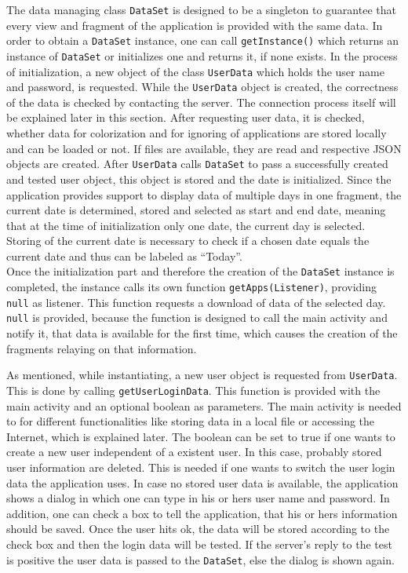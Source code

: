 The  data managing class \lstinline{DataSet} is designed to be a singleton to guarantee that every view and fragment of the application is provided with the same data. In order to obtain a \lstinline$DataSet$ instance, one can call \lstinline$getInstance()$ which returns an instance of \lstinline$DataSet$ or initializes one and returns it, if none exists. In the process of initialization, a new object of the class \lstinline$UserData$ which holds the user name and password, is requested. While the \lstinline$UserData$ object is created, the correctness of the data is checked by contacting the server. The connection process itself will be explained later in this section. After requesting user data, it is checked, whether data for colorization and for ignoring of applications are stored locally and can be loaded or not. If files are available, they are read and respective JSON objects are created. After \lstinline$UserData$ calls \lstinline$DataSet$ to pass a successfully created and tested user object, this object is stored and the date is initialized. Since the application provides support to display data of multiple days in one fragment, the current date is determined, stored and selected as start and end date, meaning that at the time of initialization only one date, the current day is selected. Storing of the current date is necessary to check if a chosen date equals the current date and thus can be labeled as ``Today''.\\
Once the initialization part and therefore the creation of the \lstinline$DataSet$ instance is completed, the instance calls its own function \lstinline$getApps(Listener)$, providing \lstinline$null$ as listener. This function requests a download of data of the selected day. \lstinline$null$ is provided, because the function is designed to call the main activity and notify it, that data is available for the first time, which causes the creation of the fragments relaying on that information.

As mentioned,  while instantiating, a new user object is requested from \lstinline$UserData$. This is done by calling \lstinline$getUserLoginData$. This function is provided with the main activity and an optional boolean as parameters. The main activity is needed to for different functionalities like storing data in a local file or accessing the Internet, which is explained later. The boolean can be set to true if one wants to create a new user independent of a existent user. In this case, probably stored user information are deleted. This is needed if one wants to switch the user login data the application uses. In case no stored user data is available, the application shows a dialog in which one can type in his or hers user name and password. In addition, one can check a box to tell the application, that his or hers information should be saved. Once the user hits ok, the data will be stored according to the check box and then the login data will be tested. If the server's reply to the test is positive the user data is passed to the \lstinline$DataSet$, else the dialog is shown again.


